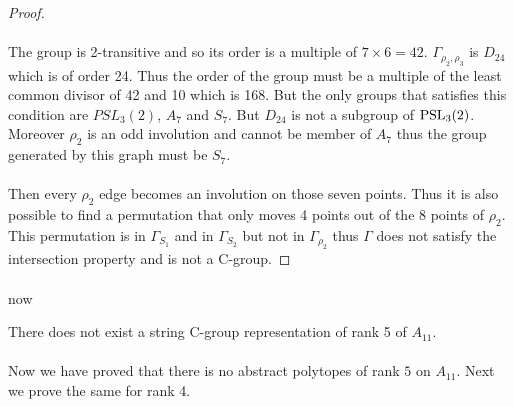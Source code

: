 \begin{proof}
  \paragraph{}
  The group is 2-transitive and so its order is a multiple of $7 \times 6 = 42$. $\Gamma_{\rho_2, \rho_3}$ is $D_{24}$ which is of order 24. Thus the order of the group must be a multiple of the least common divisor of 42 and 10 which is 168. But the only groups that satisfies this condition are $PSL_3(2)$, $A_7$ and $S_7$. But $D_{24}$ is not a subgroup of $\operatorname{PSL}_3(2)$. Moreover $\rho_2$ is an odd involution and cannot be member of $A_7$ thus the group generated by this graph must be $S_7$.

  \paragraph{}
  Then every $\rho_2$ edge becomes an involution on those seven points. Thus it is also possible to find a permutation that only moves 4 points out of the 8 points of $\rho_2$. This permutation is in $\Gamma_{S_1}$ and in $\Gamma_{S_2}$ but not in $\Gamma_{\rho_2}$ thus $\Gamma$ does not satisfy the intersection property and is not a C-group.

\end{proof}

\paragraph{}
now

\begin{theorem}
  There does not exist a string C-group representation of rank 5 of $A_{11}$.
\end{theorem}

\paragraph{}
Now we have proved that there is no abstract polytopes of rank $5$ on $A_{11}$. Next we prove the same for rank 4.
